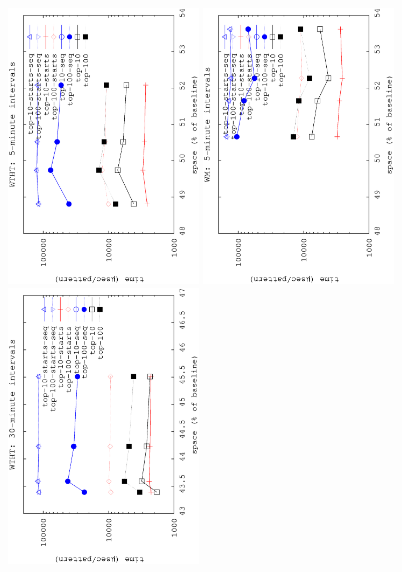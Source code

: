 \begin{figure}[!ht]
\begin{center}
		{\includegraphics[angle=-90,width=0.45\textwidth]{figures_synt/porto_st_topk_ht_5.eps}}
		{\includegraphics[angle=-90,width=0.45\textwidth]{figures_synt/porto_st_topk_wm_5.eps}}
		{\includegraphics[angle=-90,width=0.45\textwidth]{figures_synt/porto_st_topk_ht_30.eps}}

\end{center}
\end{figure}
